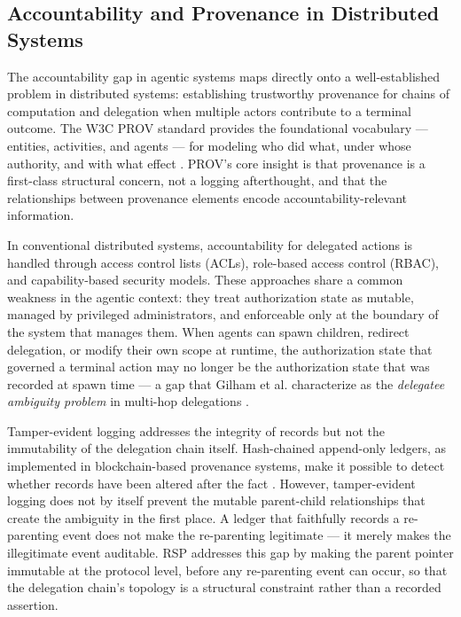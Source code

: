 \subsection{Accountability and Provenance in Distributed Systems}

The accountability gap in agentic systems maps directly onto a well-established problem in distributed systems: establishing trustworthy provenance for chains of computation and delegation when multiple actors contribute to a terminal outcome. The W3C PROV standard provides the foundational vocabulary --- entities, activities, and agents --- for modeling who did what, under whose authority, and with what effect \cite{prov-standard}. PROV's core insight is that provenance is a first-class structural concern, not a logging afterthought, and that the relationships between provenance elements encode accountability-relevant information.

In conventional distributed systems, accountability for delegated actions is handled through access control lists (ACLs), role-based access control (RBAC), and capability-based security models. These approaches share a common weakness in the agentic context: they treat authorization state as mutable, managed by privileged administrators, and enforceable only at the boundary of the system that manages them. When agents can spawn children, redirect delegation, or modify their own scope at runtime, the authorization state that governed a terminal action may no longer be the authorization state that was recorded at spawn time --- a gap that Gilham et al. characterize as the \emph{delegatee ambiguity problem} in multi-hop delegations \cite{hdp-draft,hdp-draft-2}.

Tamper-evident logging addresses the integrity of records but not the immutability of the delegation chain itself. Hash-chained append-only ledgers, as implemented in blockchain-based provenance systems, make it possible to detect whether records have been altered after the fact \cite{prov-standard}. However, tamper-evident logging does not by itself prevent the mutable parent-child relationships that create the ambiguity in the first place. A ledger that faithfully records a re-parenting event does not make the re-parenting legitimate --- it merely makes the illegitimate event auditable. RSP addresses this gap by making the parent pointer immutable at the protocol level, before any re-parenting event can occur, so that the delegation chain's topology is a structural constraint rather than a recorded assertion.

